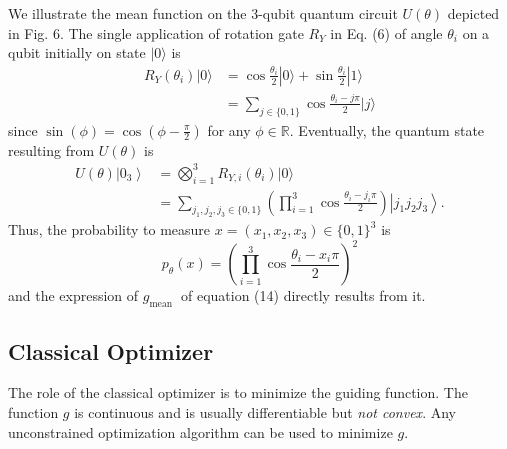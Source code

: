 \begin{example}
    We illustrate the mean function on the 3-qubit quantum circuit $U(\theta)$ depicted in Fig. 6. The single application of rotation gate $R_{Y}$ in Eq. (6) of angle $\theta_{i}$ on a qubit initially on state $|0\rangle$ is
\begin{equation}
\begin{aligned}
R_{Y}\left(\theta_{i}\right)|0\rangle & =\cos \frac{\theta_{i}}{2}|0\rangle+\sin \frac{\theta_{i}}{2}|1\rangle \\
& =\sum_{j \in\{0,1\}} \cos \frac{\theta_{i}-j \pi}{2}|j\rangle
\end{aligned}
\end{equation}
since $\sin (\phi)=\cos \left(\phi-\frac{\pi}{2}\right)$ for any $\phi \in \mathbb{R}$. Eventually, the quantum state resulting from $U(\theta)$ is
\begin{equation}
\begin{aligned}
U(\theta)\left|0_{3}\right\rangle & =\bigotimes_{i=1}^{3} R_{Y, i}\left(\theta_{i}\right)|0\rangle \\
& =\sum_{j_{1}, j_{2}, j_{3} \in\{0,1\}}\left(\prod_{i=1}^{3} \cos \frac{\theta_{i}-j_{i} \pi}{2}\right)\left|j_{1} j_{2} j_{3}\right\rangle.
\end{aligned}
\end{equation}
Thus, the probability to measure $x=\left(x_{1}, x_{2}, x_{3}\right) \in\{0,1\}^{3}$ is
\begin{equation}
    p_{\theta}(x)=\left(\prod_{i=1}^{3} \cos \frac{\theta_{i}-x_{i} \pi}{2}\right)^{2} \tag{15}
\end{equation}
and the expression of $g_{\text {mean }}$ of equation (14) directly results from it.
\end{example}

\subsection{Classical Optimizer} %

The role of the classical optimizer is to minimize the guiding function. The function $g$ is continuous and is usually differentiable but \textit{not convex}. Any unconstrained optimization algorithm can be used to minimize $g$.

